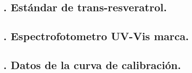 \subsection*{\theanexo. Estándar de trans-resveratrol.}
\label{anexo:estandar}

\subsection*{\theanexo. Espectrofotometro UV-Vis marca.}
\label{anexo:espectro}

\subsection*{\theanexo. Datos de la curva de calibración.}
\label{anexo:stats}



